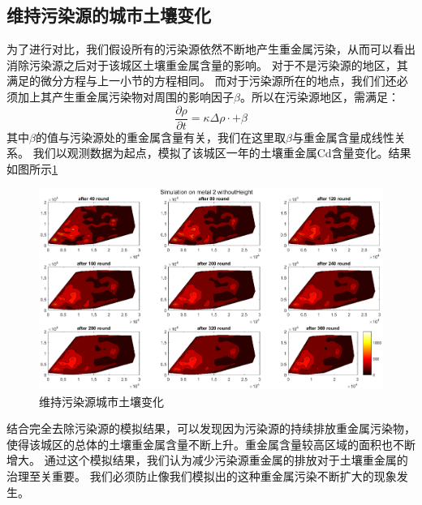 \documentclass[a4paper]{article}
\begin{document}
\subsection{维持污染源的城市土壤变化}
为了进行对比，我们假设所有的污染源依然不断地产生重金属污染，从而可以看出消除污染源之后对于该城区土壤重金属含量的影响。
对于不是污染源的地区，其满足的微分方程与上一小节的方程相同。
而对于污染源所在的地点，我们们还必须加上其产生重金属污染物对周围的影响因子$\beta$。所以在污染源地区，需满足：
\begin{equation}
 \frac{\partial \rho}{\partial t}=\kappa \Delta \rho \cdot  + \beta
\end{equation}
其中$\beta$的值与污染源处的重金属含量有关，我们在这里取$\beta$与重金属含量成线性关系。
我们以观测数据为起点，模拟了该城区一年的土壤重金属Cd含量变化。结果如图所示\ref{fig:pollution-without-height}
\begin{figure}[H]
    \centerline{
    \includegraphics[scale=0.5]{pictures/pollution-without-height.eps}}
    \caption{维持污染源城市土壤变化}
    \label{fig:pollution-without-height}
\end{figure}
\indent 结合完全去除污染源的模拟结果，可以发现因为污染源的持续排放重金属污染物，
使得该城区的总体的土壤重金属含量不断上升。重金属含量较高区域的面积也不断增大。
通过这个模拟结果，我们认为减少污染源重金属的排放对于土壤重金属的治理至关重要。
我们必须防止像我们模拟出的这种重金属污染不断扩大的现象发生。
\end{document}
